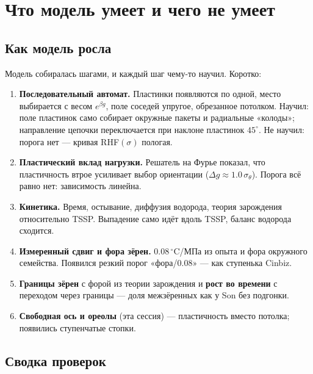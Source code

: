 \chapter{Что модель умеет и чего не умеет}\label{ch:results}

\section{Как модель росла}

Модель собиралась шагами, и каждый шаг чему-то научил. Коротко:
\begin{enumerate}
\item \textbf{Последовательный автомат.} Пластинки появляются по одной, место выбирается с весом
  $e^{\beta g}$, поле соседей упругое, обрезанное потолком. Научил: поле пластинок само собирает
  окружные пакеты и радиальные «колоды»; направление цепочки переключается при наклоне пластинок
  $45^\circ$. Не научил: порога нет --- кривая RHF$(\sigma)$ пологая.
\item \textbf{Пластический вклад нагрузки.} Решатель на Фурье показал, что пластичность втрое
  усиливает выбор ориентации ($\Delta g\approx1.0\,\sigma_\theta$). Порога всё равно нет: зависимость линейна.
\item \textbf{Кинетика.} Время, остывание, диффузия водорода, теория зарождения относительно TSSP.
  Выпадение само идёт вдоль TSSP, баланс водорода сходится.
\item \textbf{Измеренный сдвиг и фора зёрен.} $0.08\,^\circ$C/МПа из опыта и фора окружного
  семейства. Появился резкий порог «фора/0.08» --- как ступенька Cinbiz.
\item \textbf{Границы зёрен} с форой из теории зарождения и \textbf{рост во времени} с переходом
  через границы --- доля межзёренных как у Son без подгонки.
\item \textbf{Свободная ось и ореолы} (эта сессия) --- пластичность вместо потолка; появились
  ступенчатые стопки.
\end{enumerate}

\section{Сводка проверок}

